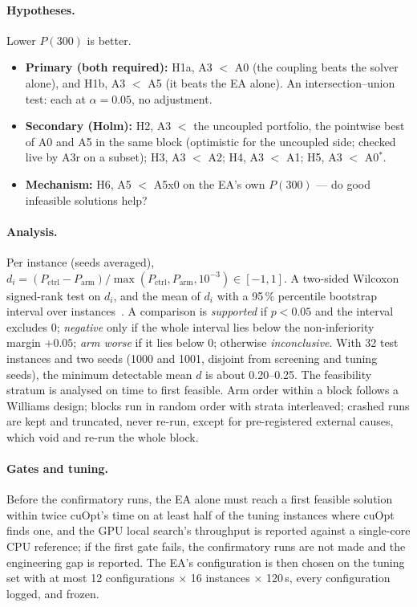 \paragraph{Hypotheses.} Lower $P(300)$ is better.
\begin{itemize}
\item \textbf{Primary (both required):} H1a, A3 $<$ A0 (the coupling beats the solver alone), and H1b, A3 $<$ A5 (it
  beats the EA alone). An intersection--union test: each at $\alpha = 0.05$, no adjustment.
\item \textbf{Secondary (Holm):} H2, A3 $<$ the uncoupled portfolio, the pointwise best of A0 and A5 in the same block
  (optimistic for the uncoupled side; checked live by A3r on a subset); H3, A3 $<$ A2; H4, A3 $<$ A1; H5, A3 $<$
  A0$^*$.
\item \textbf{Mechanism:} H6, A5 $<$ A5x0 on the EA's own $P(300)$ --- do good infeasible solutions help?
\end{itemize}

\paragraph{Analysis.} Per instance (seeds averaged), $d_i = (P_{\text{ctrl}} - P_{\text{arm}}) /
\max(P_{\text{ctrl}}, P_{\text{arm}}, 10^{-3}) \in [-1, 1]$. A two-sided Wilcoxon signed-rank test on $d_i$, and the mean
of $d_i$ with a 95\,\% percentile bootstrap interval over instances~\citep{dicicco1996bootstrap}. A comparison is
\emph{supported} if $p < 0.05$ and the interval excludes 0; \emph{negative} only if the whole interval lies below the
non-inferiority margin $+0.05$; \emph{arm worse} if it lies below 0; otherwise \emph{inconclusive}. With 32 test
instances and two seeds (1000 and 1001, disjoint from screening and tuning seeds), the minimum detectable mean $d$ is
about 0.20--0.25. The feasibility stratum is analysed on time to first feasible. Arm order within a block follows a
Williams design; blocks run in random order with strata interleaved; crashed runs are kept and truncated, never re-run,
except for pre-registered external causes, which void and re-run the whole block.

\paragraph{Gates and tuning.} Before the confirmatory runs, the EA alone must reach a first feasible solution within
twice cuOpt's time on at least half of the tuning instances where cuOpt finds one, and the GPU local search's throughput
is reported against a single-core CPU reference; if the first gate fails, the confirmatory runs are not made and the
engineering gap is reported. The EA's configuration is then chosen on the tuning set with at most 12 configurations
$\times$ 16 instances $\times$ 120\,s, every configuration logged, and frozen.
